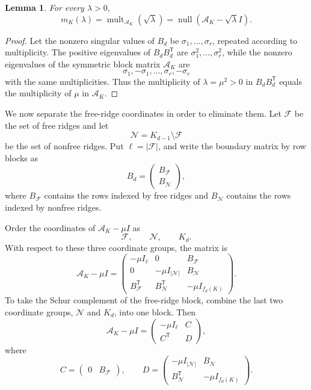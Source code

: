 \documentclass[12pt]{article}
\newtheorem{lemma}{Lemma}
\theoremstyle{remark}
\newcommand{\nullity}{\operatorname{null}}
\newcommand{\mult}{\operatorname{mult}}
\begin{document}
\begin{lemma}\label{lem:linearization}
For every $\lambda>0$,
\[
m_K(\lambda)=\mult_{\mathcal A_K}(\sqrt\lambda)
=\nullity(\mathcal A_K-\sqrt\lambda I).
\]
\end{lemma}

\begin{proof}
Let the nonzero singular values of $B_d$ be $\sigma_1,\ldots,\sigma_r$, repeated according to multiplicity.  The positive eigenvalues of $B_dB_d^{\mathsf T}$ are $\sigma_1^2,\ldots,\sigma_r^2$, while the nonzero eigenvalues of the symmetric block matrix $\mathcal A_K$ are
\[
\sigma_1,-\sigma_1,\ldots,\sigma_r,-\sigma_r
\]
with the same multiplicities.  Thus the multiplicity of $\lambda=\mu^2>0$ in $B_dB_d^{\mathsf T}$ equals the multiplicity of $\mu$ in $\mathcal A_K$.
\end{proof}

We now separate the free-ridge coordinates in order to eliminate them.  Let $\mathcal F$ be the set of free ridges and let
\[
\mathcal N=K_{d-1}\setminus\mathcal F
\]
be the set of nonfree ridges.  Put $\ell=|\mathcal F|$, and write the boundary matrix by row blocks as
\[
B_d=
\begin{pmatrix}
B_{\mathcal F}\\
B_{\mathcal N}
\end{pmatrix},
\]
where $B_{\mathcal F}$ contains the rows indexed by free ridges and $B_{\mathcal N}$ contains the rows indexed by nonfree ridges.

Order the coordinates of $\mathcal A_K-\mu I$ as
\[
\mathcal F,\qquad \mathcal N,\qquad K_d.
\]
With respect to these three coordinate groups, the matrix is
\[
\mathcal A_K-\mu I=
\begin{pmatrix}
-\mu I_\ell&0&B_{\mathcal F}\\
0&-\mu I_{|\mathcal N|}&B_{\mathcal N}\\
B_{\mathcal F}^{\mathsf T}&B_{\mathcal N}^{\mathsf T}&-\mu I_{f_d(K)}
\end{pmatrix}.
\]
To take the Schur complement of the free-ridge block, combine the last two coordinate groups, $\mathcal N$ and $K_d$, into one block.  Then
\[
\mathcal A_K-\mu I=
\begin{pmatrix}
-\mu I_\ell&C\\
C^{\mathsf T}&D
\end{pmatrix},
\]
where
\[
C=\begin{pmatrix}0&B_{\mathcal F}\end{pmatrix},
\qquad
D=
\begin{pmatrix}
-\mu I_{|\mathcal N|}&B_{\mathcal N}\\
B_{\mathcal N}^{\mathsf T}&-\mu I_{f_d(K)}
\end{pmatrix}.
\]
\end{document}
